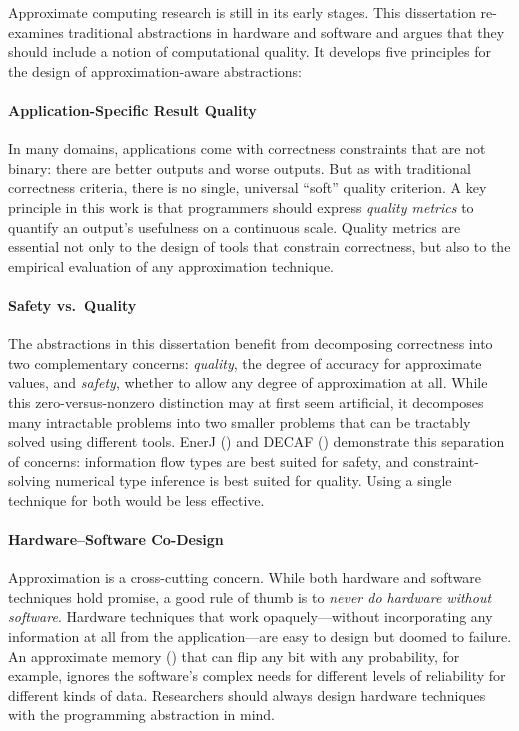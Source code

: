 Approximate computing research is still in its early stages.
This dissertation re-examines traditional abstractions in hardware and
software and argues that they should include a notion of computational
quality.
It develops five principles for the design of approximation-aware
abstractions:

\paragraph{Application-Specific Result Quality}
In many domains,
applications
come with correctness constraints that are
not binary:
there are better outputs and worse outputs.
But as with traditional correctness criteria, there is no single, universal
``soft'' quality criterion.
A key principle in this work is that programmers should express
\emph{quality metrics} to quantify an output's usefulness on a continuous
scale.
Quality metrics are essential not only to the design of tools that constrain
correctness,
but also to the empirical evaluation of any approximation technique.

\paragraph{Safety vs.~Quality}
The abstractions in this dissertation benefit from decomposing correctness
into two complementary concerns:
\emph{quality}, the degree of accuracy for approximate values, and
\emph{safety}, whether to allow any degree of approximation at all.
While this zero-versus-nonzero distinction may at first seem artificial, it
decomposes many intractable problems into two smaller problems that can be
tractably solved using different tools.
EnerJ () and DECAF () demonstrate this separation of
concerns:
information flow types are best suited for safety,
and constraint-solving numerical type inference is best suited for quality.
Using a single technique for both would be less effective.

\paragraph{Hardware–Software Co-Design}
Approximation is a cross-cutting concern.
While both hardware and software techniques hold promise, a good rule of thumb
is to \emph{never do hardware without software}.
Hardware techniques that work opaquely---without incorporating any information
at all from the application---are easy to design but doomed to failure.
An approximate memory () that can flip any bit with any
probability, for example,
ignores the software's complex needs for different levels of reliability for
different kinds of data.
Researchers should always design hardware techniques with the programming
abstraction in mind.


